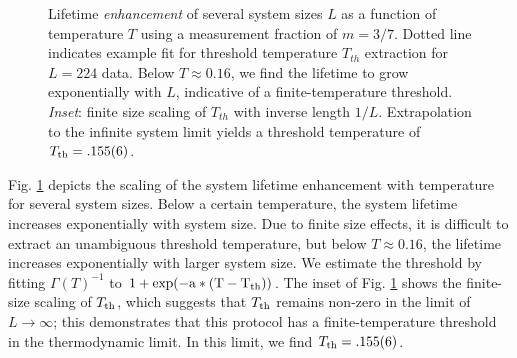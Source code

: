 \documentclass[twocolumn,superscriptaddress,aps,prb,floatfix]{revtex4-1}
\newcommand{\figref}[1]{Fig. \ref{#1}}
\begin{document}
\begin{figure}
\begin{center}
\end{center}
\caption{Lifetime {\it enhancement} of several system sizes $L$ as a function of temperature $T$ using a measurement fraction of $m=3/7$.  Dotted line indicates example fit for threshold temperature $T_{th}$ extraction for $L=224$ data.  Below $T\approx0.16$, we find the lifetime to grow exponentially with $L$, indicative of a finite-temperature threshold. {\it Inset}: finite size scaling of $T_{th}$ with inverse length $1/L$.  Extrapolation to the infinite system limit yields a threshold temperature of $T_{\rm{th}}=.155(6)$.}
\label{fig:LifetimeVsTemperature}
\end{figure}

\figref{fig:LifetimeVsTemperature} depicts the scaling of the system lifetime enhancement with temperature for several system sizes.  Below a certain temperature, the system lifetime increases exponentially with system size.  Due to finite size effects, it is difficult to extract an unambiguous threshold temperature, but below $T\approx0.16$, the lifetime increases exponentially with larger system size.  We estimate the threshold by fitting $\Gamma(T)^{-1}$ to $1+\rm{exp}(-a*(T-T_{\rm{th}}))$. The inset of \figref{fig:LifetimeVsTemperature} shows the finite-size scaling of $T_{\rm{th}}$, which suggests that $T_{\rm{th}}$ remains non-zero in the limit of $L\rightarrow \infty$; this demonstrates that this protocol has a finite-temperature threshold in the thermodynamic limit.  In this limit, we find $T_{\rm{th}}=.155(6)$.
\end{document}
